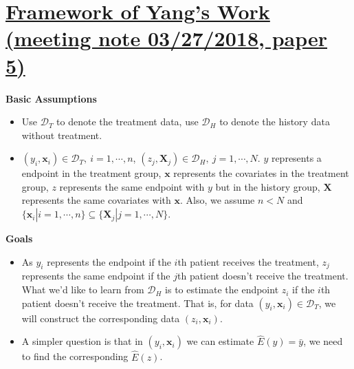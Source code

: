 \documentclass{article}
\begin{document}
%
%
%
%
\section{\href{/Users/wangbiju/Documents/Documents/UConn/Research/Single_Arm/Meeting_Notes/03/27/2018.txt}{Framework of Yang's Work (meeting note 03/27/2018, paper 5)}}
\textbf{\indent Basic Assumptions}
\begin{itemize}
\item Use $\mathscr{D}_{T}$ to denote the treatment data, use $\mathscr{D}_{H}$ to denote the history data without treatment.
\item $(y_{i}, \mathbf{x}_{i})\in\mathscr{D}_{T}, ~i=1, \cdots, n$, $(z_{j}, \mathbf{X}_{j})\in\mathscr{D}_{H},~j=1, \cdots, N$. $y$ represents a endpoint in the treatment group, $\mathbf{x}$ represents the covariates in the treatment group, $z$ represents the same endpoint with $y$ but in the history group, $\mathbf{X}$ represents the same covariates with $\mathbf{x}$. Also, we assume $n<N$ and $\{\mathbf{x}_{i}|i=1,\cdots, n\}\subseteq\{\mathbf{X}_{j}|j=1,\cdots, N\}$.
\end{itemize}

\textbf{Goals}
\begin{itemize}
\item As $y_{i}$ represents the endpoint if the $i$th patient receives the treatment, $z_{j}$ represents the same endpoint if the $j$th patient doesn't receive the treatment. What we'd like to learn from $\mathscr{D}_{H}$ is to estimate the endpoint $z_{i}$ if the $i$th patient doesn't receive the treatment. That is, for data $(y_{i}, \mathbf{x}_{i})\in\mathscr{D}_{T}$, we will construct the corresponding data $(z_{i}, \mathbf{x}_{i})$.
\item A simpler question is that in $(y_{i}, \mathbf{x}_{i})$ we can estimate $\hat{E}(y)=\bar{y}$, we need to find the corresponding $\hat{E}(z)$.
\end{itemize}
\end{document}

